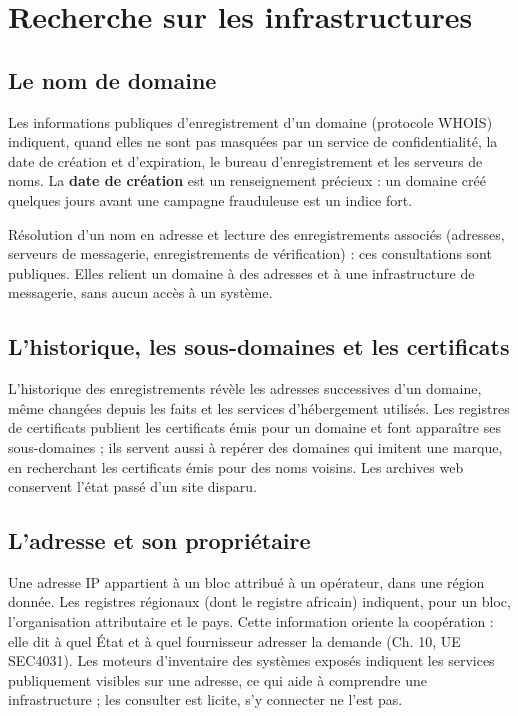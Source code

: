\section{Recherche sur les infrastructures}

\subsection{Le nom de domaine}

Les informations publiques d'enregistrement d'un domaine (protocole WHOIS) indiquent, quand elles ne sont pas masquées par un service de confidentialité, la date de création et d'expiration, le bureau d'enregistrement et les serveurs de noms. La \textbf{date de création} est un renseignement précieux : un domaine créé quelques jours avant une campagne frauduleuse est un indice fort.

Résolution d'un nom en adresse et lecture des enregistrements associés (adresses, serveurs de messagerie, enregistrements de vérification) : ces consultations sont publiques. Elles relient un domaine à des adresses et à une infrastructure de messagerie, sans aucun accès à un système.

\subsection{L'historique, les sous-domaines et les certificats}

L'historique des enregistrements révèle les adresses successives d'un domaine, même changées depuis les faits et les services d'hébergement utilisés. Les registres de certificats publient les certificats émis pour un domaine et font apparaître ses sous-domaines ; ils servent aussi à repérer des domaines qui imitent une marque, en recherchant les certificats émis pour des noms voisins. Les archives web conservent l'état passé d'un site disparu.

\subsection{L'adresse et son propriétaire}

Une adresse IP appartient à un bloc attribué à un opérateur, dans une région donnée. Les registres régionaux (dont le registre africain) indiquent, pour un bloc, l'organisation attributaire et le pays. Cette information oriente la coopération : elle dit à quel État et à quel fournisseur adresser la demande (Ch. 10, UE SEC4031). Les moteurs d'inventaire des systèmes exposés indiquent les services publiquement visibles sur une adresse, ce qui aide à comprendre une infrastructure ; les consulter est licite, s'y connecter ne l'est pas.

